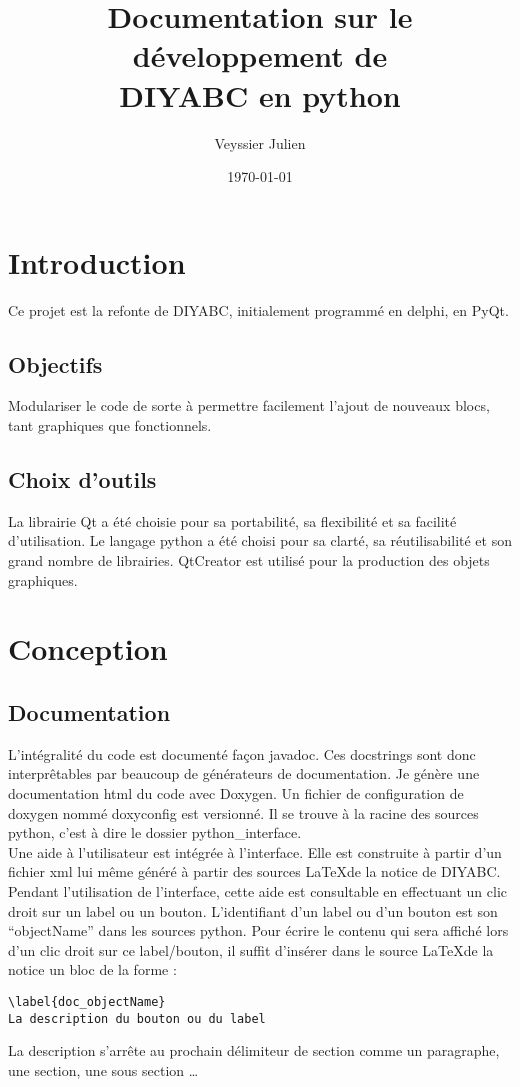 \documentclass[12pt,a4paper]{article}
\author{Veyssier Julien}
\title{Documentation sur le développement de \\
DIYABC en python}
\date\today
\begin{document}
\maketitle
\newpage

\tableofcontents

\newpage
 

\section{Introduction}
Ce projet est la refonte de DIYABC, initialement programmé en delphi, en PyQt.
	\subsection{Objectifs}
        Modulariser le code de sorte à permettre facilement l'ajout de nouveaux
        blocs, tant graphiques que fonctionnels.

	\subsection{Choix d'outils}
        La librairie Qt a été choisie pour sa portabilité, sa flexibilité et sa
        facilité d'utilisation. Le langage python a été choisi pour sa clarté,
        sa réutilisabilité et son grand nombre de librairies. QtCreator est
        utilis\'e pour la production des objets graphiques.

\section{Conception}
    
    \subsection{Documentation}
    L'intégralité du code est documenté façon javadoc. Ces docstrings sont donc
    interprêtables par beaucoup de générateurs de documentation.  Je génère une
    documentation html du code avec Doxygen. Un fichier de configuration de
    doxygen nommé doxyconfig est versionné. Il se trouve à la racine des sources
    python, c'est à dire le dossier python\_interface.\\

    Une aide à l'utilisateur est intégrée à l'interface. Elle est construite à
    partir d'un fichier xml lui même généré à partir des sources \LaTeX de la
    notice de DIYABC. Pendant l'utilisation de l'interface, cette aide est
    consultable en effectuant un clic droit sur un label ou un bouton.
    L'identifiant d'un label ou d'un bouton est son ``objectName'' dans les
    sources python. Pour écrire le contenu qui sera affiché lors d'un clic droit
    sur ce label/bouton, il suffit d'insérer dans le source \LaTeX de la notice
    un bloc de la forme : 
    \begin{verbatim}\label{doc_objectName}
La description du bouton ou du label\end{verbatim}
    La description s'arrête au prochain délimiteur de section comme un
    paragraphe, une section, une sous section \ldots
\end{document}
